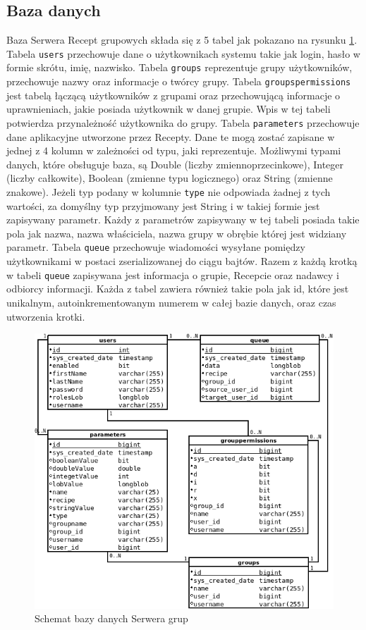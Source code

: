 \documentclass[11pt,a4paper,polish,thesis]{dcsbook}
\begin{document}
\subsection{Baza danych}
Baza Serwera Recept grupowych składa się z 5 tabel jak pokazano na rysunku \ref{fig:server_db}. 
Tabela \texttt{users} przechowuje  dane o użytkownikach systemu takie jak login, hasło w formie skrótu, imię, nazwisko.
Tabela \texttt{groups} reprezentuje grupy użytkowników, przechowuje nazwy oraz informacje o twórcy grupy.
Tabela \texttt{groupspermissions} jest tabelą łączącą użytkowników z grupami oraz przechowującą informacje o uprawnieniach, jakie posiada użytkownik w danej grupie. 
Wpis w tej tabeli potwierdza przynależność użytkownika do grupy.
Tabela \texttt{parameters} przechowuje dane aplikacyjne utworzone przez Recepty. 
Dane te mogą zostać zapisane w jednej z 4 kolumn w zależności od typu, jaki reprezentuje. 
Możliwymi typami danych, które obsługuje baza, są Double (liczby zmiennoprzecinkowe), Integer (liczby całkowite), Boolean (zmienne typu logicznego) oraz String (zmienne znakowe). 
Jeżeli typ podany w kolumnie \texttt{type} nie odpowiada żadnej z tych wartości, za domyślny typ przyjmowany jest String i w takiej formie jest zapisywany parametr.
Każdy z parametrów zapisywany w tej tabeli posiada takie pola jak nazwa, nazwa właściciela, nazwa grupy w obrębie której jest widziany parametr.
Tabela \texttt{queue} przechowuje wiadomości wysyłane pomiędzy użytkownikami w postaci zserializowanej do ciągu bajtów.
Razem z każdą krotką w tabeli \texttt{queue} zapisywana jest informacja o grupie, Recepcie oraz nadawcy i odbiorcy informacji.
Każda z tabel zawiera również takie pola jak id, które jest unikalnym, autoinkrementowanym numerem w całej bazie danych, oraz czas utworzenia krotki.
\begin{figure}[H]
  \centering
  \includegraphics[scale=0.7]{./resources/server_db.png}
  \caption{Schemat bazy danych Serwera grup}
  \label{fig:server_db}
\end{figure}
\end{document}
